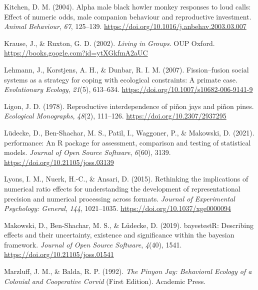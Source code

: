 \documentclass[
  ,pub,floatsintext]{apa6}
\newlength{\cslhangindent}
\newlength{\cslentryspacingunit} %
\newenvironment{CSLReferences}[2] %
 {%
  \setlength{\parindent}{0pt}
  \ifodd #1
  \let\oldpar\par
  \def\par{\hangindent=\cslhangindent\oldpar}
  \fi
  \setlength{\parskip}{#2\cslentryspacingunit}
 }%
 {}
\begin{document}
\begin{CSLReferences}{1}{0}
\leavevmode{}%
Kitchen, D. M. (2004). Alpha male black howler monkey responses to loud calls: Effect of numeric odds, male companion behaviour and reproductive investment. \emph{Animal Behaviour}, \emph{67}, 125--139. \url{https://doi.org/10.1016/j.anbehav.2003.03.007}

\leavevmode{}%
Krause, J., \& Ruxton, G. D. (2002). \emph{Living in {Groups}}. {OUP Oxford}. \url{https://books.google.com?id=ytXGkfmA2aUC}

\leavevmode{}%
Lehmann, J., Korstjens, A. H., \& Dunbar, R. I. M. (2007). Fission--fusion social systems as a strategy for coping with ecological constraints: A primate case. \emph{Evolutionary Ecology}, \emph{21}(5), 613--634. \url{https://doi.org/10.1007/s10682-006-9141-9}

\leavevmode{}%
Ligon, J. D. (1978). Reproductive interdependence of piñon jays and piñon pines. \emph{Ecological Monographs}, \emph{48}(2), 111--126. \url{https://doi.org/10.2307/2937295}

\leavevmode{}%
Lüdecke, D., Ben-Shachar, M. S., Patil, I., Waggoner, P., \& Makowski, D. (2021). {performance}: An {R} package for assessment, comparison and testing of statistical models. \emph{Journal of Open Source Software}, \emph{6}(60), 3139. \url{https://doi.org/10.21105/joss.03139}

\leavevmode{}%
Lyons, I. M., Nuerk, H.-C., \& Ansari, D. (2015). Rethinking the implications of numerical ratio effects for understanding the development of representational precision and numerical processing across formats. \emph{Journal of Experimental Psychology: General}, \emph{144}, 1021--1035. \url{https://doi.org/10.1037/xge0000094}

\leavevmode{}%
Makowski, D., Ben-Shachar, M. S., \& Lüdecke, D. (2019). bayestestR: Describing effects and their uncertainty, existence and significance within the bayesian framework. \emph{Journal of Open Source Software}, \emph{4}(40), 1541. \url{https://doi.org/10.21105/joss.01541}

\leavevmode{}%
Marzluff, J. M., \& Balda, R. P. (1992). \emph{The {Pinyon Jay}: {Behavioral Ecology} of a {Colonial} and {Cooperative Corvid}} (First Edition). {Academic Press}.


\end{CSLReferences}
\end{document}
